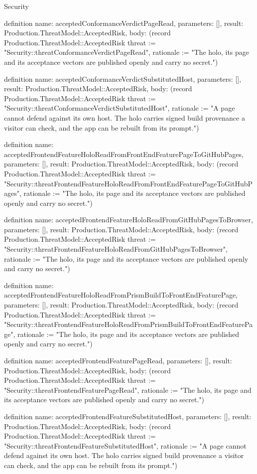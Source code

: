 \begin{lexlean}{Security}
\begin{semanticmodule}
definition{
  name: acceptedConformanceVerdictPageRead,
  parameters: [],
  result: Production.ThreatModel::AcceptedRisk,
  body: (record Production.ThreatModel::AcceptedRisk {threat := "Security::threatConformanceVerdictPageRead", rationale := "The holo, its page and its acceptance vectors are published openly and carry no secret."})
}

definition{
  name: acceptedConformanceVerdictSubstitutedHost,
  parameters: [],
  result: Production.ThreatModel::AcceptedRisk,
  body: (record Production.ThreatModel::AcceptedRisk {threat := "Security::threatConformanceVerdictSubstitutedHost", rationale := "A page cannot defend against its own host. The holo carries signed build provenance a visitor can check, and the app can be rebuilt from its prompt."})
}

definition{
  name: acceptedFrontendFeatureHoloReadFromFrontEndFeaturePageToGitHubPages,
  parameters: [],
  result: Production.ThreatModel::AcceptedRisk,
  body: (record Production.ThreatModel::AcceptedRisk {threat := "Security::threatFrontendFeatureHoloReadFromFrontEndFeaturePageToGitHubPages", rationale := "The holo, its page and its acceptance vectors are published openly and carry no secret."})
}

definition{
  name: acceptedFrontendFeatureHoloReadFromGitHubPagesToBrowser,
  parameters: [],
  result: Production.ThreatModel::AcceptedRisk,
  body: (record Production.ThreatModel::AcceptedRisk {threat := "Security::threatFrontendFeatureHoloReadFromGitHubPagesToBrowser", rationale := "The holo, its page and its acceptance vectors are published openly and carry no secret."})
}

definition{
  name: acceptedFrontendFeatureHoloReadFromPrismBuildToFrontEndFeaturePage,
  parameters: [],
  result: Production.ThreatModel::AcceptedRisk,
  body: (record Production.ThreatModel::AcceptedRisk {threat := "Security::threatFrontendFeatureHoloReadFromPrismBuildToFrontEndFeaturePage", rationale := "The holo, its page and its acceptance vectors are published openly and carry no secret."})
}

definition{
  name: acceptedFrontendFeaturePageRead,
  parameters: [],
  result: Production.ThreatModel::AcceptedRisk,
  body: (record Production.ThreatModel::AcceptedRisk {threat := "Security::threatFrontendFeaturePageRead", rationale := "The holo, its page and its acceptance vectors are published openly and carry no secret."})
}

definition{
  name: acceptedFrontendFeatureSubstitutedHost,
  parameters: [],
  result: Production.ThreatModel::AcceptedRisk,
  body: (record Production.ThreatModel::AcceptedRisk {threat := "Security::threatFrontendFeatureSubstitutedHost", rationale := "A page cannot defend against its own host. The holo carries signed build provenance a visitor can check, and the app can be rebuilt from its prompt."})
}


\end{semanticmodule}
\end{lexlean}
